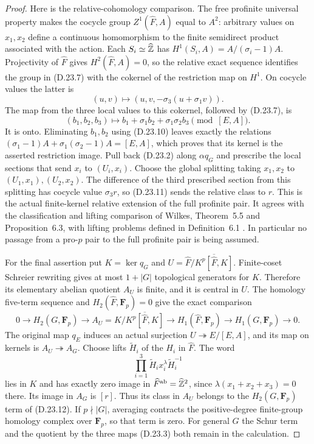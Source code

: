 \begin{proof}
Here is the relative-cohomology comparison.  The free profinite
universal property makes the cocycle group
$Z^1(\widehat F,A)$ equal to $A^2$: arbitrary values on $x_1,x_2$
define a continuous homomorphism to the finite semidirect product
associated with the action.  Each $S_i\simeq\widehat{\mathbb Z}$ has
$H^1(S_i,A)=A/(\sigma_i-1)A$.  Projectivity of $\widehat F$
gives $H^2(\widehat F,A)=0$, so the relative exact sequence
identifies the group in \textup{(D.23.7)} with the cokernel of
the restriction map on $H^1$.  On cocycle values the latter is
\[
 (u,v)\longmapsto
       (u,v,-\sigma_3(u+\sigma_1v)).
 \tag{D.23.10}
\]
The map from the three local values to this cokernel, followed
by \textup{(D.23.7)}, is
\[
 (b_1,b_2,b_3)\longmapsto
       b_1+\sigma_1b_2+\sigma_1\sigma_2b_3\pmod{[E,A]}.
 \tag{D.23.11}
\]
It is onto.  Eliminating $b_1,b_2$ using
\textup{(D.23.10)} leaves exactly the relations
$(\sigma_1-1)A+\sigma_1(\sigma_2-1)A=[E,A]$, which proves
that its kernel is the asserted restriction image.
Pull back \textup{(D.23.2)} along $\alpha q_G$ and prescribe the
local sections that send $x_i$ to $(U_i,x_i)$.  Choose the global
splitting taking $x_1,x_2$ to $(U_1,x_1),(U_2,x_2)$.
The difference of the third prescribed section from this splitting
has cocycle value $\sigma_3r$, so
\textup{(D.23.11)} sends the relative class to $r$.
This is the actual finite-kernel relative extension of the
full profinite pair.  It agrees with the classification and
lifting comparison of Wilkes, Theorem~5.5 and Proposition~6.3,
with lifting problems defined in Definition~6.1
\cite{APeripheralWilkes2025}.  In particular no passage from a
pro-$p$ pair to the full profinite pair is being assumed.

For the final assertion put $K=\ker q_G$ and
$U=\widehat F/\overline{K^p[\widehat F,K]}$.
Finite-coset Schreier rewriting gives at most $1+|G|$ topological
generators for $K$.  Therefore its elementary abelian quotient
$A_U$ is finite, and it is central in $U$.  The homology five-term sequence
and $H_2(\widehat F,\mathbf F_p)=0$ give the exact comparison
\[
 0\longrightarrow H_2(G,\mathbf F_p)\longrightarrow
 A_U=K/\overline{K^p[\widehat F,K]}
 \longrightarrow H_1(\widehat F,\mathbf F_p)
 \longrightarrow H_1(G,\mathbf F_p)\longrightarrow0.
 \tag{D.23.12}
\]
The original map $q_E$ induces an actual surjection
$U\twoheadrightarrow E/[E,A]$, and its map on kernels is
$A_U\twoheadrightarrow A_G$.  Choose lifts $\widetilde H_i$
of the $H_i$ in $\widehat F$.  The word
\[
 \prod_{i=1}^3\widetilde H_i x_i^\lambda
                    \widetilde H_i^{-1}
 \tag{D.23.13}
\]
lies in $K$ and has exactly zero image in
$\widehat F^{\rm ab}=\widehat{\mathbb Z}^2$, since
$\lambda(x_1+x_2+x_3)=0$ there.  Its image in $A_G$ is $[r]$.
Thus its class in $A_U$ belongs to the $H_2(G,\mathbf F_p)$
term of \textup{(D.23.12)}.  If $p\nmid|G|$, averaging contracts
the positive-degree finite-group homology complex over
$\mathbf F_p$, so that term is zero.  For general $G$ the Schur
term and the quotient by the three maps \textup{(D.23.3)} both
remain in the calculation.
\end{proof}

